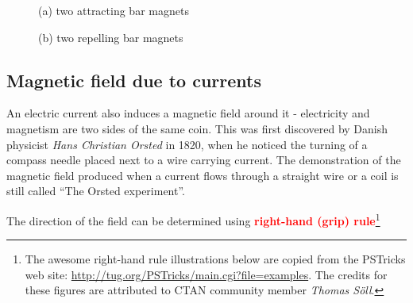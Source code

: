\documentclass[a4paper,12pt]{book}
\newcounter{example}[chapter]
\newcommand{\keypoint}[1]{\textbf{\textcolor{red}{#1}}}
\newcommand{\keypoint}[1]{\textbf{\textcolor{red}{#1}}}
\begin{document}
\begin{figure}
\begin{minipage}{0.48\linewidth}
\begin{center}

(a) two attracting bar magnets
\end{center}
\end{minipage}
\begin{minipage}{0.48\textwidth}
\begin{center}

(b) two repelling bar magnets
\end{center}
\end{minipage}
\end{figure}

\subsection{Magnetic field due to currents}
An electric current also induces a magnetic field around it - electricity and magnetism are two sides of the same coin. This was first discovered by Danish physicist \emph{Hans Christian Orsted} in 1820, when he noticed the turning of a compass needle placed next to a wire carrying current. The demonstration of the magnetic field produced when a current flows through a straight wire or a coil is still called ``The Orsted experiment''.

The direction of the field can be determined using \keypoint{right-hand (grip) rule}\footnote[][-2cm]{The awesome right-hand rule illustrations below are copied from the PSTricks web site: \url{http://tug.org/PSTricks/main.cgi?file=examples}. The credits for these figures are attributed to CTAN community member \emph{Thomas S\"{o}ll}.}
\end{document}
